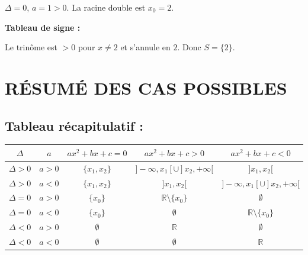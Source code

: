 \documentclass[12pt,a4paper]{article}
\begin{document}
\begin{itemize}
\begin{enumerate}[label=\arabic*)]
        $\Delta = 0$, $a = 1 > 0$. La racine double est $x_0 = 2$.
        
        \textbf{Tableau de signe :}
    \begin{center}
    \end{center}
        
        Le trinôme est $> 0$ pour $x \neq 2$ et s'annule en $2$.
        Donc $S = \{2\}$.
    \end{enumerate}
\end{itemize}

\newpage
\section*{\color{myred} RÉSUMÉ DES CAS POSSIBLES}

\subsection*{\color{myred} Tableau récapitulatif :}

\begin{center}
\renewcommand{\arraystretch}{1.5}
\begin{tabular}{|c|c|c|c|c|}
\hline
$\Delta$ & $a$ & $ax^2+bx+c=0$ & $ax^2+bx+c>0$ & $ax^2+bx+c<0$ \\
\hline
$\Delta > 0$ & $a>0$ & $\{x_1, x_2\}$ & $]-\infty, x_1[ \cup ]x_2, +\infty[$ & $]x_1, x_2[$ \\
\hline
$\Delta > 0$ & $a<0$ & $\{x_1, x_2\}$ & $]x_1, x_2[$ & $]-\infty, x_1[ \cup ]x_2, +\infty[$ \\
\hline
$\Delta = 0$ & $a>0$ & $\{x_0\}$ & $\mathbb{R} \setminus \{x_0\}$ & $\emptyset$ \\
\hline
$\Delta = 0$ & $a<0$ & $\{x_0\}$ & $\emptyset$ & $\mathbb{R} \setminus \{x_0\}$ \\
\hline
$\Delta < 0$ & $a>0$ & $\emptyset$ & $\mathbb{R}$ & $\emptyset$ \\
\hline
$\Delta < 0$ & $a<0$ & $\emptyset$ & $\emptyset$ & $\mathbb{R}$ \\
\hline
\end{tabular}
\end{center}
\end{document}
